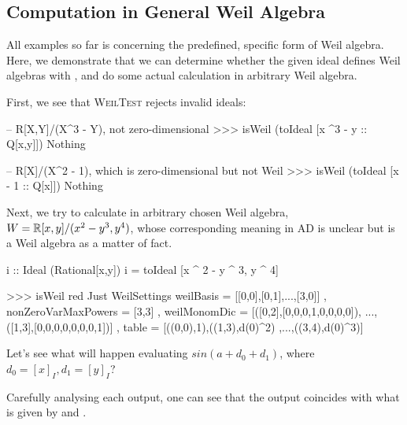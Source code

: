 \documentclass[%
  sigconf,authorversion,screen]{acmart}
\begin{document}
\subsection{Computation in General Weil Algebra}
All examples so far is concerning the predefined, specific form of Weil algebra.
Here, we demonstrate that we can determine whether the given ideal defines Weil algebras with , and do some actual calculation in arbitrary Weil algebra.

First, we see that \textsc{WeilTest} rejects invalid ideals:

\begin{code}
-- R[X,Y]/(X^3 - Y), not zero-dimensional
>>> isWeil (toIdeal [x ^3 - y :: Q[x,y]])
Nothing

-- R[X]/(X^2 - 1), which is zero-dimensional but not Weil
>>> isWeil (toIdeal [x - 1 :: Q[x]])
Nothing
\end{code}

Next, we try to calculate in arbitrary chosen Weil algebra, $W = \mathbb{R}[x,y]/(x^2 - y^3, y^4)$, whose corresponding meaning in AD is unclear but is a Weil algebra as a matter of fact.

\begin{code}
i :: Ideal (Rational[x,y])
i = toIdeal [x ^ 2 - y ^ 3, y ^ 4]

>>> isWeil red
Just WeilSettings 
  {weilBasis =
    [[0,0],[0,1],...,[3,0]]
  , nonZeroVarMaxPowers = [3,3]
  , weilMonomDic = 
    [([0,2],[0,0,0,1,0,0,0,0]),
      ...,([1,3],[0,0,0,0,0,0,0,1])]
  , table = [((0,0),1),((1,3),d(0)^2)
      ,...,((3,4),d(0)^3)]
  }
\end{code}

Let's see what will happen evaluating $sin(a + d_0 + d_1)$, where $d_0 = [x]_I, d_1 = [y]_I$?


Carefully analysing each output, one can see that the output coincides with what is given by  and .
\end{document}
